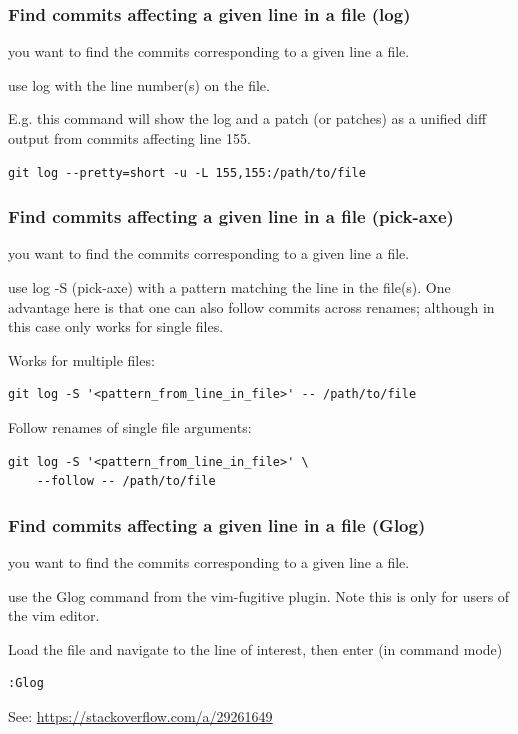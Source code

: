\documentclass{git_course}
\begin{document}
\begin{frame}[fragile]
    \frametitle{Find commits affecting a given line in a file (log)}

     you want to find the commits corresponding to a given
    line a file.

     use log with the line number(s) on the file.

    E.g. this command will show the log and a patch (or patches) as a unified diff
    output from commits affecting line 155.
\begin{lstlisting}
git log --pretty=short -u -L 155,155:/path/to/file
\end{lstlisting}

\end{frame}

\begin{frame}[fragile]
    \frametitle{Find commits affecting a given line in a file (pick-axe)}

     you want to find the commits corresponding to a given
    line a file.

     use log -S (pick-axe) with a pattern matching the line
    in the file(s).  One advantage here is that one can also follow commits
    across renames; although in this case only works for single files.

Works for multiple files:
\begin{lstlisting}
git log -S '<pattern_from_line_in_file>' -- /path/to/file
\end{lstlisting}

Follow renames of single file arguments:
\begin{lstlisting}
git log -S '<pattern_from_line_in_file>' \
    --follow -- /path/to/file
\end{lstlisting}

\end{frame}


\begin{frame}[fragile]
    \frametitle{Find commits affecting a given line in a file (Glog)}

     you want to find the commits corresponding to a given
    line a file.

     use the Glog command from the vim-fugitive plugin.  Note
    this is only for users of the vim editor.

    Load the file and navigate to the line of interest, then enter (in
    command mode)
\begin{lstlisting}
:Glog
\end{lstlisting}

    See: \url{https://stackoverflow.com/a/29261649}
\end{frame}
\end{document}
